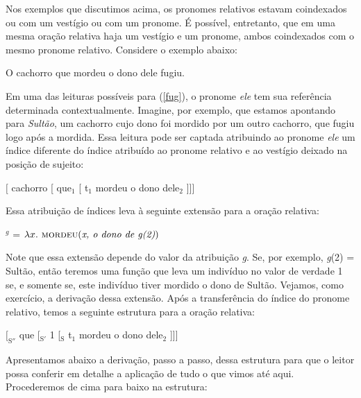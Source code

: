 Nos exemplos que discutimos acima, os pronomes relativos estavam
coindexados ou com um vestígio ou com um pronome. É possível,
entretanto, que em uma mesma oração relativa haja um vestígio e um
pronome, ambos coindexados com o mesmo pronome relativo. Considere
o exemplo abaixo:

\begin{exe}
    \ex O cachorro que mordeu o dono dele fugiu. \label{fug}
\end{exe}

\n Em uma das leituras possíveis para (\ref{fug}), o pronome
\textit{ele} tem sua referência determinada contextualmente. Imagine, por exemplo,
que estamos apontando para \textit{Sultão}, um cachorro cujo dono
foi mordido por um outro cachorro, que fugiu logo após a mordida.
Essa leitura pode ser captada atribuindo ao pronome \textit{ele}
um índice diferente do índice atribuído ao pronome relativo e ao
vestígio deixado na posição de sujeito:

\begin{exe}
    \ex $[$ cachorro [ que$_{1}$ [ t$_{1}$ mordeu o dono dele$_{2}$ ]]]
    \label{est}
\end{exe}

\n Essa atribuição de índices leva à seguinte extensão para a
oração relativa:

\begin{exe}
	\ex {}$^{g}$ = $\lambda x.\ \text{\textsc{mordeu}(\textit{x, o dono de g(2)})}$
\end{exe}

\n Note que essa extensão depende do valor da atribuição
\textit{g}. Se, por exemplo, \textit{g}(2) = Sultão, então teremos
uma função que leva um indivíduo no valor de verdade 1 se, e
somente se, este indivíduo tiver mordido o dono de Sultão. Vejamos, como exercício, a derivação dessa extensão. Após a transferência do índice do
pronome relativo, temos a seguinte estrutura para a oração relativa:

\begin{exe}
    \ex $[_{\text{S}''}$ que [$_{\text{S}'}$ 1 [$_{\text{S}}$ t$_{1}$ mordeu o dono dele$_{2}$ ]]]   \label{esa}
\end{exe}

\n Apresentamos abaixo a derivação, passo a passo, dessa estrutura para que o leitor possa conferir em detalhe a aplicação de tudo o que vimos até aqui. Procederemos de cima para baixo na estrutura:

